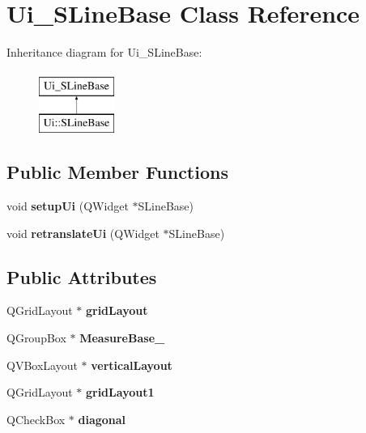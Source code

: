 \hypertarget{class_ui___s_line_base}{}\section{Ui\+\_\+\+S\+Line\+Base Class Reference}
\label{class_ui___s_line_base}
Inheritance diagram for Ui\+\_\+\+S\+Line\+Base\+:\begin{figure}[H]
\begin{center}
\leavevmode
\includegraphics[height=2.000000cm]{class_ui___s_line_base}
\end{center}
\end{figure}
\subsection*{Public Member Functions}
\begin{DoxyCompactItemize}
\item 
\mbox{\label{class_ui___s_line_base_a1cf45fb70c3e4d7f2c0ba940eeef755c}} 
void {\bfseries setup\+Ui} (Q\+Widget $\ast$S\+Line\+Base)
\item 
\mbox{\label{class_ui___s_line_base_a4cc4a36687c3460bc39fbd3824f76304}} 
void {\bfseries retranslate\+Ui} (Q\+Widget $\ast$S\+Line\+Base)
\end{DoxyCompactItemize}
\subsection*{Public Attributes}
\begin{DoxyCompactItemize}
\item 
\mbox{\label{class_ui___s_line_base_ac04c90f943e050f443b9c25b83930b61}} 
Q\+Grid\+Layout $\ast$ {\bfseries grid\+Layout}
\item 
\mbox{\label{class_ui___s_line_base_ab85caebea51a4748f31a07e56e9acdc2}} 
Q\+Group\+Box $\ast$ {\bfseries Measure\+Base\+\_}
\item 
\mbox{\label{class_ui___s_line_base_a0be305d222e3301cd1359976e7fc4c25}} 
Q\+V\+Box\+Layout $\ast$ {\bfseries vertical\+Layout}
\item 
\mbox{\label{class_ui___s_line_base_a8b1afdc658e2ddba6369912442d2f377}} 
Q\+Grid\+Layout $\ast$ {\bfseries grid\+Layout1}
\item 
\mbox{\label{class_ui___s_line_base_a5107543d46fbecf52bde7de3fe4a004b}} 
Q\+Check\+Box $\ast$ {\bfseries diagonal}
\end{DoxyCompactItemize}


